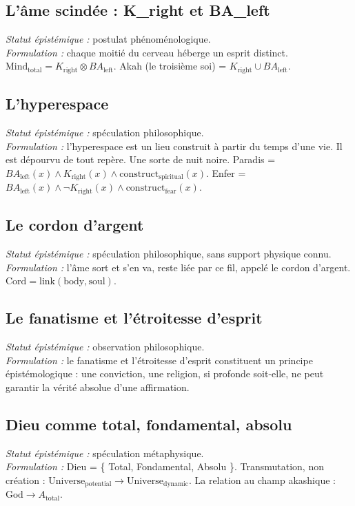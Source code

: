 \documentclass[11pt,a4paper]{article}
\begin{document}
\subsection{L'âme scindée : K\_right et BA\_left}
\textit{Statut épistémique :} postulat phénoménologique. \\
\textit{Formulation :} chaque moitié du cerveau héberge un esprit distinct. $\text{Mind}_{\text{total}} = K_{\text{right}} \otimes BA_{\text{left}}$. Akah (le troisième soi) = $K_{\text{right}} \cup BA_{\text{left}}$.

\subsection{L'hyperespace}
\textit{Statut épistémique :} spéculation philosophique. \\
\textit{Formulation :} l'hyperespace est un lieu construit à partir du temps d'une vie. Il est dépourvu de tout repère. Une sorte de nuit noire. Paradis = $BA_{\text{left}}(x) \land K_{\text{right}}(x) \land \text{construct}_{\text{spiritual}}(x)$. Enfer = $BA_{\text{left}}(x) \land \neg K_{\text{right}}(x) \land \text{construct}_{\text{fear}}(x)$.

\subsection{Le cordon d'argent}
\textit{Statut épistémique :} spéculation philosophique, sans support physique connu. \\
\textit{Formulation :} l'âme sort et s'en va, reste liée par ce fil, appelé le cordon d'argent. $\text{Cord} = \text{link}(\text{body}, \text{soul})$.

\subsection{Le fanatisme et l'étroitesse d'esprit}
\textit{Statut épistémique :} observation philosophique. \\
\textit{Formulation :} le fanatisme et l'étroitesse d'esprit constituent un principe épistémologique : une conviction, une religion, si profonde soit-elle, ne peut garantir la vérité absolue d'une affirmation.

\subsection{Dieu comme total, fondamental, absolu}
\textit{Statut épistémique :} spéculation métaphysique. \\
\textit{Formulation :} Dieu = \{ Total, Fondamental, Absolu \}. Transmutation, non création : $\text{Universe}_{\text{potential}} \to \text{Universe}_{\text{dynamic}}$. La relation au champ akashique : $\text{God} \to A_{\text{total}}$.
\end{document}

